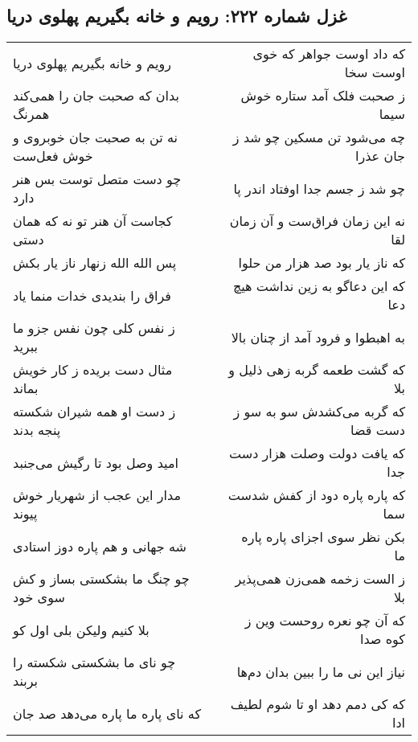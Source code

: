 \begin{center}
\section*{غزل شماره ۲۲۲: رویم و خانه بگیریم پهلوی دریا}
\label{sec:0222}
\begin{longtable}{l p{0.5cm} r}
رویم و خانه بگیریم پهلوی دریا
&&
که داد اوست جواهر که خوی اوست سخا
\\
بدان که صحبت جان را همی‌کند همرنگ
&&
ز صحبت فلک آمد ستاره خوش سیما
\\
نه تن به صحبت جان خوبروی و خوش فعل‌ست
&&
چه می‌شود تن مسکین چو شد ز جان عذرا
\\
چو دست متصل توست بس هنر دارد
&&
چو شد ز جسم جدا اوفتاد اندر پا
\\
کجاست آن هنر تو نه که همان دستی
&&
نه این زمان فراق‌ست و آن زمان لقا
\\
پس الله الله زنهار ناز یار بکش
&&
که ناز یار بود صد هزار من حلوا
\\
فراق را بندیدی خدات منما یاد
&&
که این دعاگو به زین نداشت هیچ دعا
\\
ز نفس کلی چون نفس جزو ما ببرید
&&
به اهبطوا و فرود آمد از چنان بالا
\\
مثال دست بریده ز کار خویش بماند
&&
که گشت طعمه گربه زهی ذلیل و بلا
\\
ز دست او همه شیران شکسته پنجه بدند
&&
که گربه می‌کشدش سو به سو ز دست قضا
\\
امید وصل بود تا رگیش می‌جنبد
&&
که یافت دولت وصلت هزار دست جدا
\\
مدار این عجب از شهریار خوش پیوند
&&
که پاره پاره دود از کفش شدست سما
\\
شه جهانی و هم پاره دوز استادی
&&
بکن نظر سوی اجزای پاره پاره ما
\\
چو چنگ ما بشکستی بساز و کش سوی خود
&&
ز الست زخمه همی‌زن همی‌پذیر بلا
\\
بلا کنیم ولیکن بلی اول کو
&&
که آن چو نعره روحست وین ز کوه صدا
\\
چو نای ما بشکستی شکسته را بربند
&&
نیاز این نی ما را ببین بدان دم‌ها
\\
که نای پاره ما پاره می‌دهد صد جان
&&
که کی دمم دهد او تا شوم لطیف ادا
\\
\end{longtable}
\end{center}
